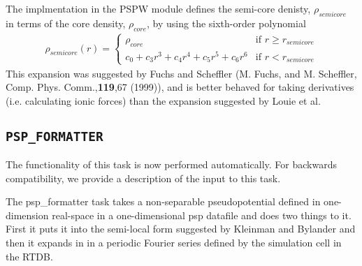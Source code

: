 The implmentation in the PSPW module defines the semi-core denisty, $\rho_{semicore}$ in terms of 
the core density, $\rho_{core}$, by using the sixth-order polynomial
\begin{eqnarray}
\rho_{semicore}(r) = \left\{ \begin{array}{ll}
                              \rho_{core} & \mbox{if $r \geq r_{semicore}$} \\
                              c_0 + c_3 r^3 + c_4 r^4 + c_5 r^5 + c_6 r^6 &  \mbox{if $r < r_{semicore}$}
                            \end{array}
                     \right.
\end{eqnarray}
This expansion was suggested by Fuchs and Scheffler 
(M. Fuchs, and M. Scheffler, Comp. Phys. Comm.,\textbf{119},67 (1999)), 
and is better behaved for taking derivatives (i.e. calculating ionic forces) than the expansion suggested 
by Louie et al.


\subsection{\tt PSP\_FORMATTER}
\label{sec:pspw_psp_formatter}
The functionality of this task is now performed automatically. For backwards 
compatibility, we provide a description of the input to this task.

The psp\_formatter task takes a non-separable pseudopotential defined in
one-dimension real-space in a one-dimensional psp datafile and does two 
things to it.  First it puts it into the semi-local form suggested by 
Kleinman and Bylander and then it expands in in a periodic Fourier
series defined by the simulation cell in the RTDB.  


